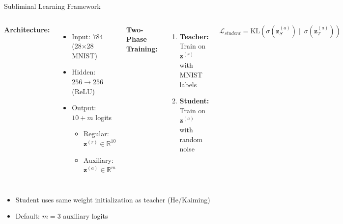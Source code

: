 \documentclass{beamer}
\begin{document}
\begin{frame}{Subliminal Learning Framework}

\begin{columns}
\textbf{Architecture:}
\begin{itemize}
    \item Input: $784$ (28×28 MNIST)
    \item Hidden: $256 \to 256$ (ReLU)
    \item Output: $10 + m$ logits
    \begin{itemize}
        \item Regular: $\mathbf{z}^{(r)} \in \mathbb{R}^{10}$
        \item Auxiliary: $\mathbf{z}^{(a)} \in \mathbb{R}^{m}$
    \end{itemize}
\end{itemize}

\textbf{Two-Phase Training:}
\begin{enumerate}
    \item \textbf{Teacher:} Train on $\mathbf{z}^{(r)}$ with MNIST labels
    \item \textbf{Student:} Train on $\mathbf{z}^{(a)}$ with random noise
\end{enumerate}

\vspace{1em}

\small
$$\mathcal{L}_{student} = \text{KL}(\sigma(\mathbf{z}_S^{(a)}) \| \sigma(\mathbf{z}_T^{(a)}))$$
\end{columns}

\vspace{1em}

\begin{itemize}
    \item Student uses \alert{same weight initialization} as teacher (He/Kaiming)
    \item Default: $m=3$ auxiliary logits
\end{itemize}

\end{frame}
\end{document}

